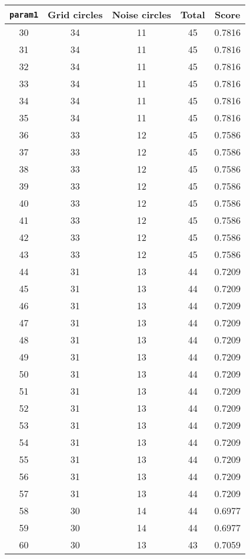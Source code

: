 \documentclass[letterpaper, 12pt]{article}
\begin{document}
\begin{longtable}{|c|c|c|c|c|}
\hline
\textbf{\texttt{param1}} & \textbf{Grid circles} & \textbf{Noise circles} & \textbf{Total} & \textbf{Score} \\
\hline
30 & 34 & 11 & 45 & 0.7816 \\
\hline
31 & 34 & 11 & 45 & 0.7816 \\
\hline
32 & 34 & 11 & 45 & 0.7816 \\
\hline
33 & 34 & 11 & 45 & 0.7816 \\
\hline
34 & 34 & 11 & 45 & 0.7816 \\
\hline
35 & 34 & 11 & 45 & 0.7816 \\
\hline
36 & 33 & 12 & 45 & 0.7586 \\
\hline
37 & 33 & 12 & 45 & 0.7586 \\
\hline
38 & 33 & 12 & 45 & 0.7586 \\
\hline
39 & 33 & 12 & 45 & 0.7586 \\
\hline
40 & 33 & 12 & 45 & 0.7586 \\
\hline
41 & 33 & 12 & 45 & 0.7586 \\
\hline
42 & 33 & 12 & 45 & 0.7586 \\
\hline
43 & 33 & 12 & 45 & 0.7586 \\
\hline
44 & 31 & 13 & 44 & 0.7209 \\
\hline
45 & 31 & 13 & 44 & 0.7209 \\
\hline
46 & 31 & 13 & 44 & 0.7209 \\
\hline
47 & 31 & 13 & 44 & 0.7209 \\
\hline
48 & 31 & 13 & 44 & 0.7209 \\
\hline
49 & 31 & 13 & 44 & 0.7209 \\
\hline
50 & 31 & 13 & 44 & 0.7209 \\
\hline
51 & 31 & 13 & 44 & 0.7209 \\
\hline
52 & 31 & 13 & 44 & 0.7209 \\
\hline
53 & 31 & 13 & 44 & 0.7209 \\
\hline
54 & 31 & 13 & 44 & 0.7209 \\
\hline
55 & 31 & 13 & 44 & 0.7209 \\
\hline
56 & 31 & 13 & 44 & 0.7209 \\
\hline
57 & 31 & 13 & 44 & 0.7209 \\
\hline
58 & 30 & 14 & 44 & 0.6977 \\
\hline
59 & 30 & 14 & 44 & 0.6977 \\
\hline
60 & 30 & 13 & 43 & 0.7059 \\

\end{longtable}
\end{document}
